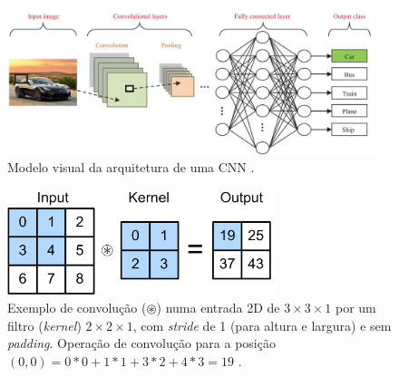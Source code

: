 \documentclass[12pt, a4paper, english, brazil]{article}
\begin{document}
\begin{figure}[htbp]
    \centering
    \includegraphics[width=0.95\textwidth]{img/cnn.jpg}
    \caption{Modelo visual da arquitetura de uma CNN \cite{Rawat_Wang_2017}.}
    \label{fig:cnn}
\end{figure}

\begin{figure}[htbp]
    \centering
    \includegraphics[width=0.7\textwidth]{img/conv.jpg}
    \caption{Exemplo de convolução ($\circledast$) numa entrada 2D de $3\times3\times1$ por um filtro (\textit{kernel}) $2\times2\times1$, com \textit{stride} de 1 (para altura e largura) e sem \textit{padding}. Operação de convolução para a posição $(0, 0) = 0 * 0 + 1 * 1 + 3 * 2 + 4 * 3 = 19$ \cite{Zhang_2021}.}
    \label{fig:conv}
\end{figure}
\end{document}
